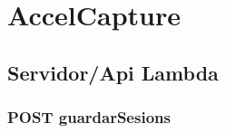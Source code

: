 \section{AccelCapture}
\subsection{Servidor/Api Lambda}\label{app:code:accelcapturelambda} 
\subsubsection{POST guardarSesions}

